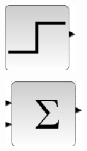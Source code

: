 \documentclass[12pt]{mwart}
\begin{document}
	\begin{center}

	\begin{minipage}{0.14\linewidth}
		\includegraphics[width=\linewidth]{STEP_FUNCTION.png}
	\end{minipage}
	\hfill
	\begin{minipage}{0.15\linewidth}
		\includegraphics[width=\linewidth]{BIGSOM_f.png}

\end{minipage}
\end{center}
\end{document}
